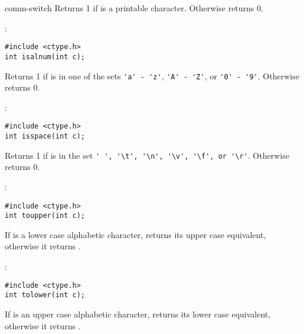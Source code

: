 \begin{Ventry2}{comm-switch  }
Returns 1 if  is a printable character.  Otherwise returns 0.

\item[isalnum]
:

\begin{production}
\begin{verbatim}
#include <ctype.h>
int isalnum(int c);
\end{verbatim}
\end{production}


Returns 1 if  is in one of the sets \verb+'a' - 'z'+, 
\verb+'A' - 'Z'+, or \verb+'0' - '9'+.  Otherwise returns 0.

\item[isspace]
:

\begin{production}
\begin{verbatim}
#include <ctype.h>
int isspace(int c);
\end{verbatim}
\end{production}


Returns 1 if  is in the set \verb+' ', '\t', '\n', '\v', '\f', or '\r'+.  
Otherwise returns  0.

\item[toupper]
:

\begin{production}
\begin{verbatim}
#include <ctype.h>
int toupper(int c);
\end{verbatim}
\end{production}


If  is a lower case alphabetic character,  returns its upper
case equivalent, otherwise it returns .

\item[tolower]
:

\begin{production}
\begin{verbatim}
#include <ctype.h>
int tolower(int c);
\end{verbatim}
\end{production}

If  is an upper case alphabetic character,  returns its
lower case equivalent, otherwise it returns .

\end{Ventry2}



